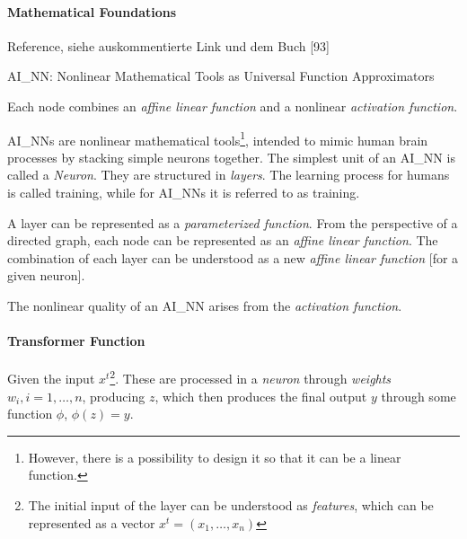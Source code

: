 \paragraph{Mathematical Foundations}
Reference, siehe auskommentierte Link und dem Buch \cite{MLK_Andr_Buk}[93] %
\begin{description}
	\item \gls{AI_NN}: Nonlinear Mathematical Tools as Universal Function Approximators
	\item Each node combines an \textit{affine linear function} and a nonlinear \textit{activation function}. 
\end{description}

\glspl{AI_NN} are nonlinear mathematical tools\footnote{However, there is a possibility to design it so that it can be a linear function.}, intended to mimic human brain processes by stacking simple neurons together. The simplest unit of an \gls{AI_NN} is called a \textit{Neuron}. They are structured in \textit{layers}. The learning process for humans is called training, while for \glspl{AI_NN} it is referred to as training.

A layer can be represented as a \textit{parameterized function}. From the perspective of a directed graph, each node can be represented as an \textit{affine linear function}. The combination of each layer can be understood as a new \textit{affine linear function} [for a given neuron].

The nonlinear quality of an \gls{AI_NN} arises from the \textit{activation function}.

\paragraph{Transformer Function} Given the input $x^t$\footnote{
	The initial input of the layer can be understood as \textit{features}, which can be represented as a vector  $x^t = (x_1, \dots, x_n)$
}. These are processed in a \textit{neuron} through \textit{weights} $w_i, i=1,\dots, n$, producing $z$, which then produces the final output $y$ through some function $\phi$, $\phi(z) = y$.

